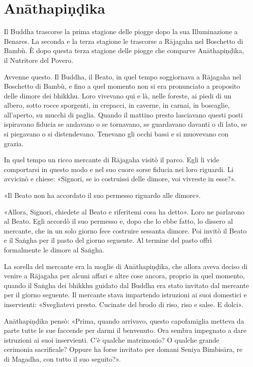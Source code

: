 \chapter{Anāthapiṇḍika}

 Il Buddha trascorse la prima stagione delle piogge
dopo la sua Illuminazione a Benares. La seconda e la terza stagione le trascorse
a Rājagaha nel Boschetto di Bambù. È dopo questa terza stagione delle piogge che
comparve Anāthapiṇḍika, il Nutritore del Povero.

 Avvenne questo. Il Buddha, il Beato, in quel tempo
soggiornava a Rājagaha nel Boschetto di Bambù, e fino a quel momento non si era
pronunciato a proposito delle dimore dei bhikkhu. Loro vivevano qui e là, nelle
foreste, ai piedi di un albero, sotto rocce sporgenti, in crepacci, in caverne,
in carnai, in boscaglie, all’aperto, su mucchi di paglia. Quando il mattino
presto lasciavano questi posti ispiravano fiducia se andavano o se tornavano, se
guardavano davanti o di lato, se si piegavano o si distendevano. Tenevano gli
occhi bassi e si muovevano con grazia.

In quel tempo un ricco mercante di Rājagaha visitò il parco. Egli li vide
comportarsi in questo modo e nel suo cuore sorse fiducia nei loro riguardi. Li
avvicinò e chiese: «Signori, se io costruissi delle dimore, voi vivreste in
esse?».

«Il Beato non ha accordato il suo permesso riguardo alle dimore».

«Allora, Signori, chiedete al Beato e riferitemi cosa ha detto». Loro ne
parlarono al Beato. Egli accordò il suo permesso e, dopo che lo ebbe fatto, lo
dissero al mercante, che in un solo giorno fece costruire sessanta dimore. Poi
invitò il Beato e il Saṅgha per il pasto del giorno seguente. Al termine del
pasto offrì formalmente le dimore al Saṅgha.

La sorella del mercante era la moglie di Anāthapiṇḍika, che allora aveva deciso
di venire a Rājagaha per alcuni affari e altre cose ancora, proprio in quel
momento, quando il Saṅgha dei bhikkhu guidato dal Buddha era stato invitato dal
mercante per il giorno seguente. Il mercante stava impartendo istruzioni ai suoi
domestici e inservienti: «Svegliatevi presto. Cucinate del brodo di riso, riso e
salse. E dolci».

Anāthapiṇḍika pensò: «Prima, quando arrivavo, questo capofamiglia metteva da
parte tutte le sue faccende per darmi il benvenuto. Ora sembra impegnato a dare
istruzioni ai suoi inservienti. C’è qualche matrimonio? O qualche grande
cerimonia sacrificale? Oppure ha forse invitato per domani Seniya Bimbisāra, re
di Magadha, con tutto il suo seguito?».


